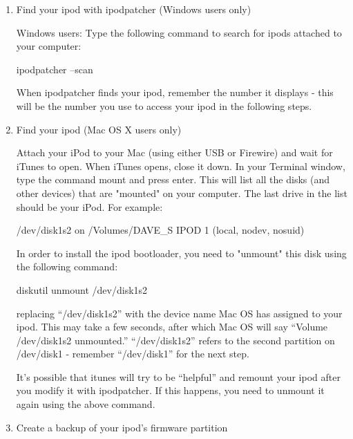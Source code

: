 \begin{enumerate}
  \item Find your ipod with ipodpatcher (Windows users only)

    Windows users:  Type the following command to search for ipods attached to 
    your computer: 
      \begin{code} 
        ipodpatcher --scan 
      \end{code}
    
    When ipodpatcher finds your ipod, remember the number it displays - this 
    will  be the number you use to access your ipod in the following steps.


  \item Find your ipod (Mac OS X users only)

    Attach your iPod to your Mac (using either USB or Firewire) and wait for 
    iTunes to open. When iTunes opens, close it down.  In your Terminal window, 
    type the command mount and press enter. This will list all the disks (and 
    other devices) that are "mounted" on your computer. The last  drive in the 
    list should be your iPod. For example: 
    \begin{code}
       /dev/disk1s2 on /Volumes/DAVE_S IPOD 1 (local, nodev, nosuid) 
    \end{code}

    In order to install the ipod bootloader, you need to "unmount" this disk 
    using   the following command: 
      \begin{code} 
        diskutil unmount /dev/disk1s2 
      \end{code}
      
    replacing ``/dev/disk1s2'' with the device name Mac OS has assigned to your
    ipod. This may take a few seconds, after which Mac OS will say ``Volume 
    /dev/disk1s2 unmounted.'' ``/dev/disk1s2'' refers to the second partition on 
    /dev/disk1 - remember   ``/dev/disk1'' for the next step.

    It's possible that itunes will try to be ``helpful'' and remount your ipod 
    after you modify it with ipodpatcher. If this happens, you need to unmount 
    it again using the above command. 
  
  \item Create a backup of your ipod's firmware partition


\end{enumerate}
